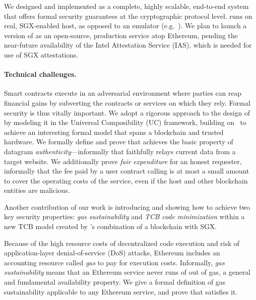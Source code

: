 We designed and implemented \tc as a complete, highly scalable, end-to-end system that offers formal security guarantees at the cryptographic protocol level. \tc runs on real, SGX-enabled host, as opposed to an emulator (e.g.~\cite{haven,VC3}). We plan to launch a version of \tc as an open-source, production service atop Ethereum, pending the near-future availability of the Intel Attestation Service (IAS), which is needed for use of SGX attestations. 


\paragraph{Technical challenges.} Smart contracts execute in an adversarial environment where parties can reap financial gains by subverting the contracts or services on which they rely. Formal security is thus vitally important. We adopt a rigorous approach to the design of \tcs by modeling it in the Universal Composibility (UC) framework, building on~\cite{hawk,sgxsok} to achieve an interesting formal model that spans a blockchain and trusted hardware. We formally define and prove that \tc achieves the basic property of datagram {\em authenticity}---informally that \tc faithfully relays current data from a target website. We additionally prove {\em fair expenditure} for an honest requester, informally that the fee paid by a user contract calling \tc is at most a small amount to cover the operating costs of the \tc service, even if the \tc host and other blockchain entities are malicious.

Another contribution of our work is introducing and showing how to achieve two key security properties: {\em gas sustainability} and {\em TCB code minimization} within a new TCB model created by \tc's combination of a blockchain with SGX. 

Because of the high resource costs of decentralized code execution and risk of application-layer denial-of-service (DoS) attacks, Ethereum includes an accounting resource called {\em gas} to pay for execution costs.  Informally, {\em gas sustainability} means that an Ethereum service never runs of out of gas, a general and fundamental availability property. We give a formal definition of gas sustainability applicable to any Ethereum service, and prove that \tc satisfies it.

